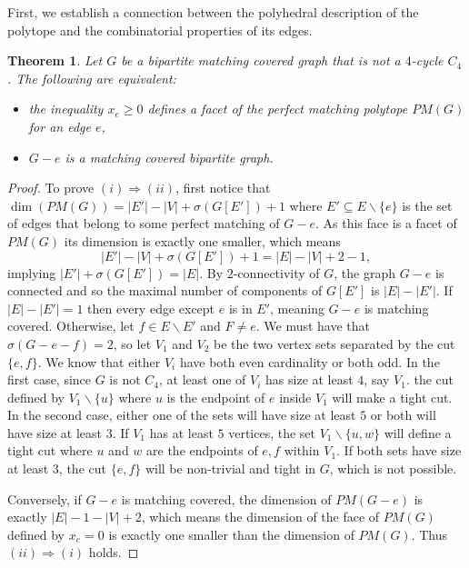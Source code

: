\documentclass[11pt]{article}
\newcommand{\1}{\mathbf{1}}
\newcommand{\0}{\mathbf{0}}
\newtheorem{theorem}{Theorem}[section]
\begin{document}
First, we establish a connection between the polyhedral description of the polytope and the combinatorial properties of its edges.
\begin{theorem}\label{thm:facets-bip}
    Let $G$ be a bipartite matching covered graph that is not a $4$-cycle $C_4$. The following are equivalent: \begin{itemize}
        \item[(i):] the inequality $x_e\geq 0$ defines a facet of the perfect matching polytope $PM(G)$ for an edge $e$,
        \item[(ii):] $G-e$ is a matching covered bipartite graph. 
    \end{itemize}
\end{theorem}
\begin{proof}
    To prove $(i) \Rightarrow (ii)$, first notice that $\dim(PM(G))=|E'|-|V|+ \sigma(G[E'])+1$ where $E' \subseteq E\backslash \{e\}$ is the set of edges that belong to some perfect matching of $G-e$. As this face is a facet of $PM(G)$ its dimension is exactly one smaller, which means \begin{equation*}
        |E'|-|V|+ \sigma(G[E'])+1 = |E|-|V|+2 -1,
    \end{equation*} implying $|E'|+\sigma(G[E'])=|E|$. By $2$-connectivity of $G$, the graph $G-e$ is connected and so the maximal number of components of $G[E']$ is $|E|-|E'|$. If $|E|-|E'|=1$ then every edge except $e$ is in $E'$, meaning $G-e$ is matching covered. Otherwise, let $f \in E\backslash E'$ and $F\neq e$. We must have that $\sigma(G-e-f)=2$, so let $V_1$ and $V_2$ be the two vertex sets separated by the cut $\{e,f\}$. We know that either $V_i$ have both even cardinality or both odd. In the first case, since $G$ is not $C_4$, at least one of $V_i$ has size at least $4$, say $V_1$.  the cut defined by $V_1 \backslash \{u\}$ where $u$ is the endpoint of $e$ inside $V_1$ will make a tight cut. In the second case, either one of the sets will have size at least $5$ or both will have size at least $3$. If $V_1$ has at least $5$ vertices, the set $V_1 \backslash \{u,w\}$ will define a tight cut where $u$ and $w$ are the endpoints of $e,f$ within $V_1$. If both sets have size at least $3$, the cut $\{e,f\}$ will be non-trivial and tight in $G$, which is not possible.
    
    Conversely, if $G-e$ is matching covered, the dimension of $PM(G-e)$ is exactly $|E|-1-|V|+2$, which means the dimension of the face of $PM(G)$ defined by $x_e=0$ is exactly one smaller than the dimension of $PM(G)$. Thus $(ii) \Rightarrow (i)$ holds.
\end{proof}
\end{document}
